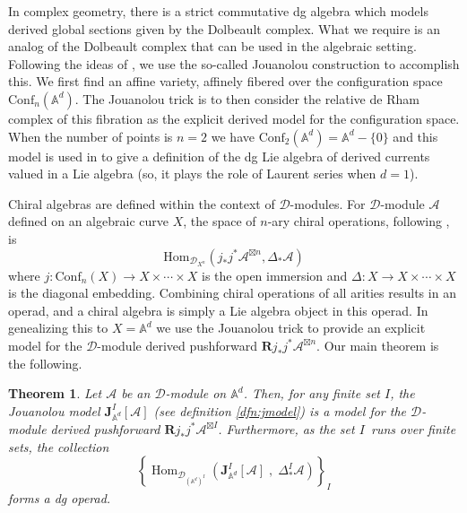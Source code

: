 \documentclass[11pt]{amsart}
\newtheorem*{thm*}{Theorem}
\theoremstyle{definition}
\theoremstyle{remark}
\numberwithin{equation}{section}
\newcommand{\op}{\operatorname}
\begin{document}
In complex geometry, there is a strict commutative dg algebra which models derived global sections given by the Dolbeault
complex.
What we require is an analog of the Dolbeault complex that can be used in the algebraic setting.
Following the ideas of \cite{FHK}, we use the so-called Jouanolou construction to accomplish this.
We first find an affine variety, affinely fibered over the configuration space $\mathrm{Conf}_n(\mathbb{A}^d)$.
The Jouanolou trick is to then consider the relative de Rham complex of this fibration as the explicit derived model
for the configuration space.
When the number of points is $n=2$ we have $\mathrm{Conf}_2(\mathbb{A}^d) = \mathbb{A}^d - \{0\}$ and this model is used in \cite{FHK} to give a definition of the dg Lie algebra of
derived currents valued in a Lie algebra (so, it plays the role of Laurent series when $d=1$).

Chiral algebras are defined within the context of $\mathcal{D}$-modules.
For $\mathcal{D}$-module $\mathcal{A}$ defined on an algebraic curve $X$, the space of $n$-ary chiral operations, following \cite{BD}, is 
\begin{equation}\label{}
  \mathrm{Hom}_{\mathcal{D}_{X^{n}}}\left(j_{*}j^*\mathcal{A}^{\boxtimes{n}},\Delta_* \mathcal{A}\right)
\end{equation}
where $j \colon \mathrm{Conf}_n(X) \to X \times \cdots \times X$ is the open immersion and $\Delta \colon X \to X \times
\cdots \times X$ is the diagonal embedding.
Combining chiral operations of all arities results in an operad, and a chiral algebra is simply a Lie algebra object in
this operad.
In genealizing this to $X = \mathbb{A}^d$ we use the Jouanolou trick to provide an explicit model for the $\mathcal{D}
$-module derived pushforward $\mathbf{R} j_* j^* \mathcal{A}^{\boxtimes n}$.
Our main theorem is the following.

\begin{thm*}
  Let $\mathcal{A}$ be an $\mathcal{D}$-module on $\mathbb{A}^d$.
  Then, for any finite set $I$, the Jouanolou model $\mathbf{J}_{\mathbb{A}^d}^I[\mathcal{A}]$ (see definition
  \ref{dfn:jmodel}) is a model for the $\mathcal{D}$-module derived pushforward $\mathbf{R} j_* j^* \mathcal{A}
  ^{\boxtimes I}$.
  Furthermore, as the set $I$~runs over finite sets, the collection 
  \begin{equation}\label{}
    \left\{\op{Hom}_{\mathcal{D}_{(\mathbb{A}^{d})^I}} \left(\mathbf{J}^I_{\mathbb{A}^d} [\mathcal{A}] \; ,
    \; \Delta_*^I \mathcal{A} \right) \right\}_{I} 
  \end{equation}
  forms a dg operad.
\end{thm*}
\end{document}
